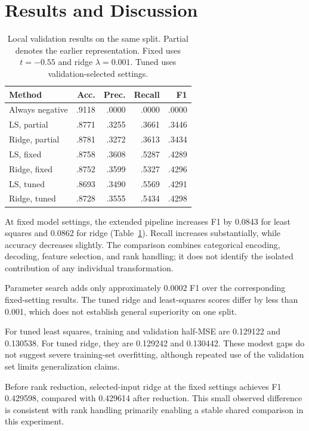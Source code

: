 \documentclass[10pt,conference,compsocconf]{IEEEtran}
\begin{document}
\section{Results and Discussion}
\begin{table}[t]
\centering
\caption{Local validation results on the same split.
Partial denotes the earlier representation.
Fixed uses $t=-0.55$ and ridge $\lambda=0.001$.
Tuned uses validation-selected settings.}
\label{tab:results}
\setlength{\tabcolsep}{3pt}
\begin{tabular}{@{}lrrrr@{}}
\toprule
Method & Acc. & Prec. & Recall & F1 \\
\midrule
Always negative & .9118 & .0000 & .0000 & .0000 \\
LS, partial & .8771 & .3255 & .3661 & .3446 \\
Ridge, partial & .8781 & .3272 & .3613 & .3434 \\
\midrule
LS, fixed & .8758 & .3608 & .5287 & .4289 \\
Ridge, fixed & .8752 & .3599 & .5327 & .4296 \\
LS, tuned & .8693 & .3490 & .5569 & .4291 \\
Ridge, tuned & .8728 & .3555 & .5434 & .4298 \\
\bottomrule
\end{tabular}
\end{table}

At fixed model settings, the extended pipeline increases
F1 by 0.0843 for least squares and 0.0862 for ridge
(Table~\ref{tab:results}). Recall increases substantially,
while accuracy decreases slightly. The comparison combines
categorical encoding, decoding, feature selection, and rank
handling; it does not identify the isolated contribution
of any individual transformation.

Parameter search adds only approximately 0.0002 F1 over
the corresponding fixed-setting results. The tuned ridge
and least-squares scores differ by less than 0.001, which
does not establish general superiority on one split.

For tuned least squares, training and validation half-MSE
are 0.129122 and 0.130538. For tuned ridge, they are
0.129242 and 0.130442. These modest gaps do not suggest
severe training-set overfitting, although repeated use of
the validation set limits generalization claims.

Before rank reduction, selected-input ridge at the fixed
settings achieves F1 0.429598, compared with 0.429614 after
reduction. This small observed difference is consistent
with rank handling primarily enabling a stable shared
comparison in this experiment.
\end{document}
